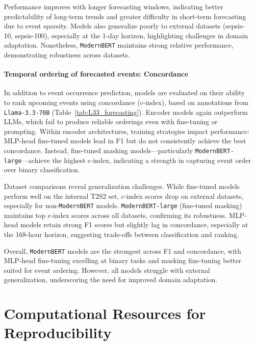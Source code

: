 Performance improves with longer forecasting windows, indicating better predictability of long-term trends and greater difficulty in short-term forecasting due to event sparsity. Models also generalize poorly to external datasets (sepsis-10, sepsis-100), especially at the 1-day horizon, highlighting challenges in domain adaptation. Nonetheless, \texttt{ModernBERT} maintains strong relative performance, demonstrating robustness across datasets.

\paragraph{Temporal ordering of forecasted events: Concordance} In addition to event occurrence prediction, models are evaluated on their ability to rank upcoming events using concordance (c-index), based on annotations from \texttt{Llama-3.3-70B} (Table~\ref{tab:L33_forecasting}). Encoder models again outperform LLMs, which fail to produce reliable orderings even with fine-tuning or prompting. Within encoder architectures, training strategies impact performance: MLP-head fine-tuned models lead in F1 but do not consistently achieve the best concordance. Instead, fine-tuned masking models—particularly \texttt{ModernBERT-large}—achieve the highest c-index, indicating a strength in capturing event order over binary classification.

Dataset comparisons reveal generalization challenges. While fine-tuned models perform well on the internal T2S2 set, c-index scores drop on external datasets, especially for non-\texttt{ModernBERT} models. \texttt{ModernBERT-large} (fine-tuned masking) maintains top c-index scores across all datasets, confirming its robustness. MLP-head models retain strong F1 scores but slightly lag in concordance, especially at the 168-hour horizon, suggesting trade-offs between classification and ranking.

Overall, \texttt{ModernBERT} models are the strongest across F1 and concordance, with MLP-head fine-tuning excelling at binary tasks and masking fine-tuning better suited for event ordering. However, all models struggle with external generalization, underscoring the need for improved domain adaptation.

\section{Computational Resources for Reproducibility}
\label{apd:compute_resources}

